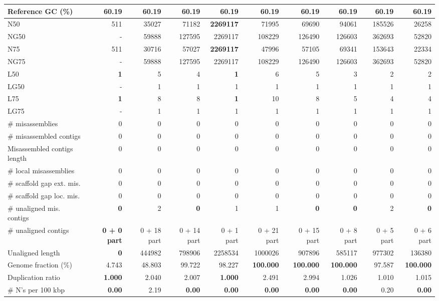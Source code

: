 \documentclass[12pt,a4paper]{article}
\begin{document}
\begin{table}[ht]
\begin{center}
\begin{tabular}{|l*{9}{|r}|}
Reference GC (\%) & 60.19 & 60.19 & 60.19 & 60.19 & 60.19 & 60.19 & 60.19 & 60.19 & 60.19 \\ \hline
N50 & 511 & 35027 & 71182 & {\bf 2269117} & 71995 & 69690 & 94061 & 185526 & 26258 \\ \hline
NG50 & - & 59888 & 127595 & 2269117 & 108229 & 126490 & 126603 & 362693 & 52820 \\ \hline
N75 & 511 & 30716 & 57027 & {\bf 2269117} & 47996 & 57105 & 69341 & 153643 & 22334 \\ \hline
NG75 & - & 59888 & 127595 & 2269117 & 108229 & 126490 & 126603 & 362693 & 52820 \\ \hline
L50 & {\bf 1} & 5 & 4 & {\bf 1} & 6 & 5 & 3 & 2 & 2 \\ \hline
LG50 & - & 1 & 1 & 1 & 1 & 1 & 1 & 1 & 1 \\ \hline
L75 & {\bf 1} & 8 & 8 & {\bf 1} & 10 & 8 & 5 & 4 & 4 \\ \hline
LG75 & - & 1 & 1 & 1 & 1 & 1 & 1 & 1 & 1 \\ \hline
\# misassemblies & 0 & 0 & 0 & 0 & 0 & 0 & 0 & 0 & 0 \\ \hline
\# misassembled contigs & 0 & 0 & 0 & 0 & 0 & 0 & 0 & 0 & 0 \\ \hline
Misassembled contigs length & 0 & 0 & 0 & 0 & 0 & 0 & 0 & 0 & 0 \\ \hline
\# local misassemblies & 0 & 0 & 0 & 0 & 0 & 0 & 0 & 0 & 0 \\ \hline
\# scaffold gap ext. mis. & 0 & 0 & 0 & 0 & 0 & 0 & 0 & 0 & 0 \\ \hline
\# scaffold gap loc. mis. & 0 & 0 & 0 & 0 & 0 & 0 & 0 & 0 & 0 \\ \hline
\# unaligned mis. contigs & {\bf 0} & 2 & {\bf 0} & 1 & 1 & {\bf 0} & {\bf 0} & 2 & {\bf 0} \\ \hline
\# unaligned contigs & {\bf 0 + 0 part} & 0 + 18 part & 0 + 14 part & 0 + 1 part & 0 + 21 part & 0 + 15 part & 0 + 8 part & 0 + 5 part & 0 + 6 part \\ \hline
Unaligned length & {\bf 0} & 444982 & 798906 & 2258534 & 1000026 & 907896 & 585117 & 977302 & 136380 \\ \hline
Genome fraction (\%) & 4.743 & 48.803 & 99.722 & 98.227 & {\bf 100.000} & {\bf 100.000} & {\bf 100.000} & 97.587 & {\bf 100.000} \\ \hline
Duplication ratio & {\bf 1.000} & 2.040 & 2.007 & {\bf 1.000} & 2.491 & 2.994 & 1.026 & 1.010 & 1.015 \\ \hline
\# N's per 100 kbp & {\bf 0.00} & 2.19 & {\bf 0.00} & {\bf 0.00} & {\bf 0.00} & {\bf 0.00} & {\bf 0.00} & 0.20 & {\bf 0.00} \\ \hline

\end{tabular}
\end{center}
\end{table}
\end{document}

